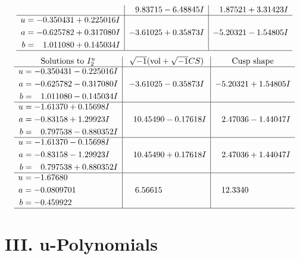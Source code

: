 \documentclass[1p]{elsarticle_modified}
\theoremstyle{definition}
\newcommand{\I}{\sqrt{-1}}
\begin{document}
$$\begin{array}{c|c|c}
 & \phantom{-}9.83715 - 6.48845 I & \phantom{-}1.87521 + 3.31423 I \\ \hline\begin{aligned}
u &= -0.350431 + 0.225016 I \\
a &= -0.625782 + 0.317080 I \\
b &= \phantom{-}1.011080 + 0.145034 I\end{aligned}
 & -3.61025 + 0.35873 I & -5.20321 - 1.54805 I\\
 \hline 
 \end{array}$$\newpage$$\begin{array}{c|c|c}  
\text{Solutions to }I^u_{2}& \I (\text{vol} + \sqrt{-1}CS) & \text{Cusp shape}\\
 \hline 
\begin{aligned}
u &= -0.350431 - 0.225016 I \\
a &= -0.625782 - 0.317080 I \\
b &= \phantom{-}1.011080 - 0.145034 I\end{aligned}
 & -3.61025 - 0.35873 I & -5.20321 + 1.54805 I \\ \hline\begin{aligned}
u &= -1.61370 + 0.15698 I \\
a &= -0.83158 + 1.29923 I \\
b &= \phantom{-}0.797538 - 0.880352 I\end{aligned}
 & \phantom{-}10.45490 - 0.17618 I & \phantom{-}2.47036 - 1.44047 I \\ \hline\begin{aligned}
u &= -1.61370 - 0.15698 I \\
a &= -0.83158 - 1.29923 I \\
b &= \phantom{-}0.797538 + 0.880352 I\end{aligned}
 & \phantom{-}10.45490 + 0.17618 I & \phantom{-}2.47036 + 1.44047 I \\ \hline\begin{aligned}
u &= -1.67680\phantom{ +0.000000I} \\
a &= -0.0809701\phantom{ +0.000000I} \\
b &= -0.459922\phantom{ +0.000000I}\end{aligned}
 & \phantom{-}6.56615\phantom{ +0.000000I} & \phantom{-}12.3340\phantom{ +0.000000I}\\
 \hline 
 \end{array}$$\newpage
\newpage\renewcommand{\arraystretch}{1}
\centering \section*{ III. u-Polynomials}
\end{document}
